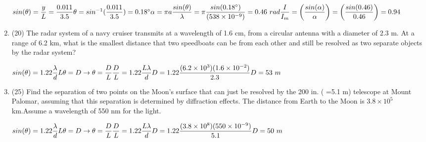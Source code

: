 \documentclass[fleqn]{article}
\begin{document}
\begin{enumerate}
      \textcolor{hwColor}{
        $
          sin(\theta)=\dfrac{y}{L}=\dfrac{0.011}{3.5} \\
          \theta=sin^{-1}(\dfrac{0.011}{3.5})=0.18^{\circ} \\
          \\
          \alpha=\pi a\dfrac{sin(\theta)}{\lambda}=\pi \dfrac{sin(0.18^{\circ})}{(538 \times 10^{-9})}=0.46 ~rad \\
          \\
          \dfrac{I}{I_m}=\left(\dfrac{sin(\alpha)}{\alpha}\right)=\left(\dfrac{sin(0.46)}{0.46}\right)=0.94
        $
      }

    \item (20) The radar system of a navy cruiser transmits at a wavelength
    of 1.6 cm, from a circular antenna with a diameter of 2.3 m. At a
    range of 6.2 km, what is the smallest distance that two speedboats
    can be from each other and still be resolved as two separate objects
    by the radar system?

      \textcolor{hwColor}{
        $
          sin(\theta)=1.22\dfrac{\lambda}{d} \\
          \\
          L\theta=D \rightarrow \theta=\dfrac{D}{L} \\
          \\
          \dfrac{D}{L}=1.22\dfrac{L\lambda}{d} \\
          \\
          D=1.22\dfrac{(6.2 \times 10^3)(1.6 \times 10^{-2})}{2.3} \\
          \\ 
          D=53 ~ m
        $
      }

    \item (25) Find the separation of two points on the Moon’s surface
    that can just be resolved by the 200 in. ( =5.1 m) telescope at
    Mount Palomar, assuming that this separation is determined by
    diffraction effects. The distance from Earth to the Moon is $3.8 \times 10^5$ km.Assume a wavelength of 550 nm for the light.

      \textcolor{hwColor}{
        $
          sin(\theta)=1.22\dfrac{\lambda}{d} \\
          \\
          L\theta=D \rightarrow \theta=\dfrac{D}{L} \\
          \\
          \dfrac{D}{L}=1.22\dfrac{L\lambda}{d} \\
          \\
          D=1.22\dfrac{(3.8 \times 10^8)(550 \times 10^{-9})}{5.1} \\
          \\ 
          D=50 ~ m
        $
      }


\end{enumerate}
\end{document}
